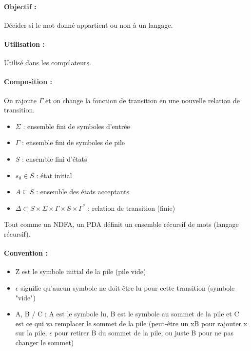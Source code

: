 \paragraph{Objectif :} Décider si le mot donné appartient ou non à un langage.

\paragraph{Utilisation :} Utilisé dans les compilateurs.

\paragraph{Composition :}
On rajoute $\Gamma$ et on change la fonction de transition en une nouvelle 
relation de transition.
\begin{itemize}
	\item $\Sigma$ : ensemble fini de symboles d'entrée
	\item $\Gamma$ : ensemble fini de symboles de pile
	\item $S$ : ensemble fini d'états
	\item $s_0 \in S$ : état initial
	\item $A \subseteq S$ : ensemble des états acceptants
	\item $\Delta \subset S \times \Sigma \times \Gamma \times S \times 
		\Gamma^*$ : relation de transition (finie)
\end{itemize}

\begin{myprop}
	Tout comme un NDFA, un PDA définit un ensemble récursif de mots (langage 
	récursif).
\end{myprop}

\paragraph{Convention :} 
\begin{itemize}
	\item Z est le symbole initial de la pile (pile vide)
	\item $\epsilon$ signifie qu’aucun symbole ne doit être lu pour cette 
		transition (symbole "vide")
	\item A, B / C : A est le symbole lu, B est le symbole au 
		sommet de la pile et C est ce qui va remplacer le 
		sommet de la pile (peut-être un xB pour 
		rajouter x sur la pile, $\epsilon$ pour retirer B du sommet de la pile, 
		ou juste B pour ne pas changer le sommet)
\end{itemize}

